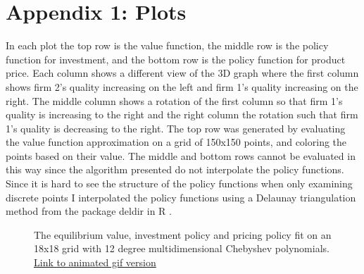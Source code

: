 \documentclass[12pt]{article}
\begin{document}



\section*{Appendix 1: Plots}

In each plot the top row is the value function, the middle row is the policy function for investment, and the bottom row is the policy function for product price. Each column shows a different view of the 3D graph where the first column shows firm 2's quality increasing on the left and firm 1's quality increasing on the right. The middle column shows a rotation of the first column so that firm 1's quality is increasing to the right and the right column the rotation such that firm 1's quality is decreasing to the right. The top row was generated by evaluating the value function approximation on a grid of 150x150 points, and coloring the points based on their value. The middle and bottom rows cannot be evaluated in this way since the algorithm presented do not interpolate the policy functions. Since it is hard to see the structure of the policy functions when only examining discrete points I interpolated the policy functions using a Delaunay triangulation method from the package deldir in R \citep{deldir}.

\begin{figure}[H]
  \centering
  \caption{The equilibrium value, investment policy and pricing policy fit on an 18x18 grid with 12 degree multidimensional Chebyshev polynomials. \href{https://github.com/wmjones/VFA-for-dynamic-games/blob/master/gifs/gif_cai_18_12.gif}{Link to animated gif version}}
\end{figure}
\end{document}

